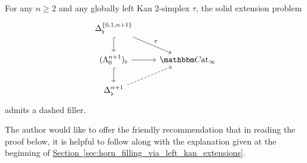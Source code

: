 \documentclass[main.tex]{subfiles}
\begin{document}
\begin{theorem}
  For any $n \geq 2$ and any globally left Kan $2$-simplex $\tau$, the solid extension problem
  \begin{equation*}
    \begin{tikzcd}
      \Delta^{\{0, 1, n+1\}}_{\flat}
      \arrow[d, hook]
      \arrow[dr, "\tau"]
      \\
      (\Lambda^{n+1}_{0})_{\flat}
      \arrow[r]
      \arrow[d, hook]
      & \ICCat
      \\
      \Delta^{n+1}_{\flat}
      \arrow[ur, dashed]
    \end{tikzcd}
  \end{equation*}
  admits a dashed filler.
\end{theorem}

The author would like to offer the friendly recommendation that in reading the proof below, it is helpful to follow along with the explanation given at the beginning of \hyperref[sec:horn_filling_via_left_kan_extensions]{Section~\ref*{sec:horn_filling_via_left_kan_extensions}}.
\end{document}
